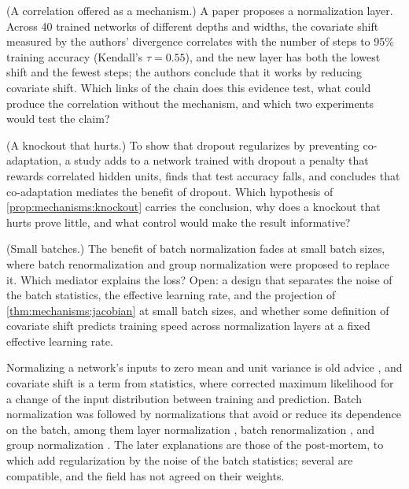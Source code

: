 \begin{refsection}
\begin{exercises}
\item \critique (A correlation offered as a mechanism.) A paper proposes a normalization layer. Across 40 trained networks of different depths and widths, the covariate shift measured by the authors' divergence correlates with the number of steps to 95\% training accuracy (Kendall's $\tau=0.55$), and the new layer has both the lowest shift and the fewest steps; the authors conclude that it works by reducing covariate shift. Which links of the chain does this evidence test, what could produce the correlation without the mechanism, and which two experiments would test the claim?\label{ex:mechanisms:critique1}

\item \critique (A knockout that hurts.) To show that dropout regularizes by preventing co-adaptation, a study adds to a network trained with dropout a penalty that rewards correlated hidden units, finds that test accuracy falls, and concludes that co-adaptation mediates the benefit of dropout. Which hypothesis of \cref{prop:mechanisms:knockout} carries the conclusion, why does a knockout that hurts prove little, and what control would make the result informative?\label{ex:mechanisms:critique2}

\item \research (Small batches.) The benefit of batch normalization fades at small batch sizes, where batch renormalization \parencite{Ioffe2017} and group normalization \parencite{WuHe2018} were proposed to replace it. Which mediator explains the loss? Open: a design that separates the noise of the batch statistics, the effective learning rate, and the projection of \cref{thm:mechanisms:jacobian} at small batch sizes, and whether some definition of covariate shift predicts training speed across normalization layers at a fixed effective learning rate.\label{ex:mechanisms:research}
\end{exercises}

\notesandrefs
Normalizing a network's inputs to zero mean and unit variance is old advice \parencite{LeCunEtAl1998}, and covariate shift is a term from statistics, where \textcite{Shimodaira2000} corrected maximum likelihood for a change of the input distribution between training and prediction. Batch normalization was followed by normalizations that avoid or reduce its dependence on the batch, among them layer normalization \parencite{BaKirosHinton2016}, batch renormalization \parencite{Ioffe2017}, and group normalization \parencite{WuHe2018}. The later explanations are those of the post-mortem, to which \textcite{LuoEtAl2019} add regularization by the noise of the batch statistics; several are compatible, and the field has not agreed on their weights.


\end{refsection}
